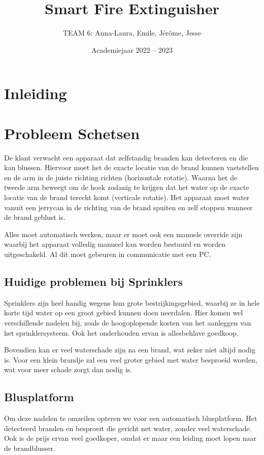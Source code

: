 \documentclass[kulak]{kulakarticle} %
\title{Smart Fire Extinguisher}
\author{TEAM 6: Anna-Laura, Emile, Jérôme, Jesse}
\date{Academiejaar 2022 -- 2023}
\begin{document}
	
	\maketitle
	
	\section*{Inleiding}
	\section{Probleem Schetsen}
	
	De klant verwacht een apparaat dat zelfstandig branden kan detecteren en die kan blussen. Hiervoor moet het de exacte locatie van de brand kunnen vaststellen en de arm in de juiste richting richten (horizontale rotatie). Waarna het de tweede arm beweegt om de hoek zodanig te krijgen dat het water op de exacte locatie van de brand terecht komt (verticale rotatie). Het apparaat moet water vanuit een jerrycan in de richting van de brand spuiten en zelf stoppen wanneer de brand geblust is. 
	
	Alles moet automatisch werken, maar er moet ook een manuele override zijn waarbij het apparaat volledig manueel kan worden bestuurd en worden uitgeschakeld. Al dit moet gebeuren in communicatie met een PC. 
	
	\subsection{Huidige problemen bij Sprinklers}
	
	Sprinklers zijn heel handig wegens hun grote bestrijkingsgebied, waarbij ze in hele korte tijd water op een groot gebied kunnen doen neerdalen. Hier komen wel verschillende nadelen bij, zoals de hoogoplopende kosten van het aanleggen van het sprinklersysteem. Ook het onderhouden ervan is allesbehlave goedkoop. 
	
	Bovendien kan er veel waterschade zijn na een brand, wat zeker niet altijd nodig is. Voor een klein brandje zal een veel groter gebied met water besproeid worden, wat voor meer schade zorgt dan nodig is.
	
	\subsection{Blusplatform}
	
	Om deze nadelen te omzeilen opteren we voor een automatisch blusplatform. Het detecteerd branden en besproeit die gericht net water, zonder veel waterschade. Ook is de prijs ervan veel goedkoper, omdat er maar een leiding moet lopen naar de brandblusser.
	
\end{document}
